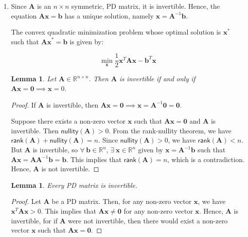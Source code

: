 \documentclass[12pt,a4paper]{article}
\newcommand{\R}{\mathbb{R}}
\newtheorem{lemma}[theorem]{Lemma}
\theoremstyle{remark}
\begin{document}
\begin{enumerate}
    \item Since $\mathbf{A}$ is an $n \times n$ symmetric, PD matrix, it is invertible. Hence, the equation $\mathbf{Ax = b}$ has a unique solution, namely $\mathbf{x} = \mathbf{A}^{-1} \mathbf{b}$.
    
    The convex quadratic minimization problem whose optimal solution is $\mathbf{x}^*$ such that $\mathbf{Ax}^* = \mathbf{b}$ is given by:
    
    \begin{equation*}
        \min_{\mathbf{x}} \frac{1}{2} \mathbf{x}^T \mathbf{A} \mathbf{x} - \mathbf{b}^T \mathbf{x}
    \end{equation*}

    \begin{lemma}
        Let $\mathbf{A} \in \R^{n \times n}$. Then $\mathbf{A}$ is invertible if and only if $\mathbf{Ax = 0} \implies \mathbf{x} = 0$.
    \end{lemma}

    \begin{proof}
        If $\mathbf{A}$ is invertible, then $\mathbf{Ax = 0} \implies \mathbf{x} = \mathbf{A}^{-1} \mathbf{0} = \mathbf{0}$.

        Suppose there exists a non-zero vector $\mathbf{x}$ such that $\mathbf{A} \mathbf{x} = \mathbf{0}$ and $\mathbf{A}$ is invertible. Then $\mathsf{nullity}(\mathbf{A}) > 0$. From the rank-nullity theorem, we have $\mathsf{rank}(\mathbf{A}) + \mathsf{nullity}(\mathbf{A}) = n$. Since $\mathsf{nullity}(\mathbf{A}) > 0$, we have $\mathsf{rank}(\mathbf{A}) < n$. But $\mathbf{A}$ is invertible, so $\forall\ \mathbf{b} \in \R^n$, $\exists\ \mathbf{x} \in \R^n$ given by $\mathbf{x} = \mathbf{A}^{-1} \mathbf{b}$ such that $\mathbf{Ax} = \mathbf{A} \mathbf{A}^{-1} \mathbf{b} = \mathbf{b}$. This implies that $\mathsf{rank}(\mathbf{A}) = n$, which is a contradiction. Hence, $\mathbf{A}$ is not invertible.
    \end{proof}

    \begin{lemma}
        Every PD matrix is invertible.
    \end{lemma}

    \begin{proof}
        Let $\mathbf{A}$ be a PD matrix. Then, for any non-zero vector $\mathbf{x}$, we have $\mathbf{x}^T \mathbf{A} \mathbf{x} > 0$. This implies that $\mathbf{A} \mathbf{x} \neq \mathbf{0}$ for any non-zero vector $\mathbf{x}$. Hence, $\mathbf{A}$ is invertible, for if $\mathbf{A}$ were not invertible, then there would exist a non-zero vector $\mathbf{x}$ such that $\mathbf{A} \mathbf{x} = \mathbf{0}$.
    \end{proof}


\end{enumerate}
\end{document}
